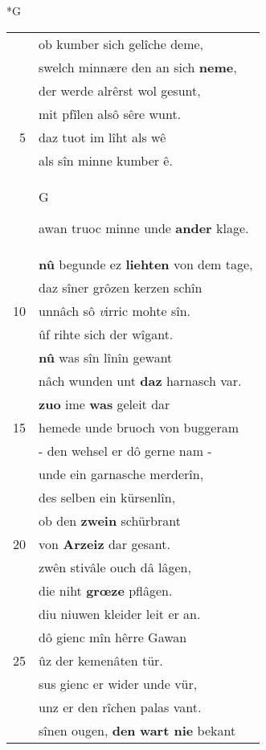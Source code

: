 \documentclass[8pt,a4paper,notitlepage]{article}
\begin{document}
\newpage
\begin{table}[ht]
\begin{minipage}[t]{0.5\linewidth}
\small
\begin{center}*G
\end{center}
\begin{tabular}{rl}
 & ob kumber sich gelîche deme,\\ 
 & swelch minnære den an sich \textbf{neme},\\ 
 & der werde alrêrst wol gesunt,\\ 
 & mit pfîlen alsô sêre wunt.\\ 
5 & daz tuot im lîht als wê\\ 
 & als sîn minne kumber ê.\\ 
 & \begin{large}G\end{large}awan truoc minne unde \textbf{ander} klage.\\ 
 & \textbf{nû} begunde ez \textbf{liehten} von dem tage,\\ 
 & daz sîner grôzen kerzen schîn\\ 
10 & unnâch sô \textit{v}irric mohte sîn.\\ 
 & ûf rihte sich der wîgant.\\ 
 & \textbf{nû} was sîn lînîn gewant\\ 
 & nâch wunden unt \textbf{daz} harnasch var.\\ 
 & \textbf{zuo} ime \textbf{was} geleit dar\\ 
15 & hemede unde bruoch von buggeram\\ 
 & - den wehsel er dô gerne nam -\\ 
 & unde ein garnasche merderîn,\\ 
 & des selben ein kürsenlîn,\\ 
 & ob den \textbf{zwein} schürbrant\\ 
20 & von \textbf{Arzeiz} dar gesant.\\ 
 & zwên stivâle ouch dâ lâgen,\\ 
 & die niht \textbf{grœze} pflâgen.\\ 
 & diu niuwen kleider leit er an.\\ 
 & dô gienc mîn hêrre Gawan\\ 
25 & ûz der kemenâten tür.\\ 
 & sus gienc er wider unde vür,\\ 
 & unz er den rîchen palas vant.\\ 
 & sînen ougen, \textbf{den} \textbf{wart nie} bekant\\ 

\end{tabular}
\end{minipage}
\end{table}
\end{document}
